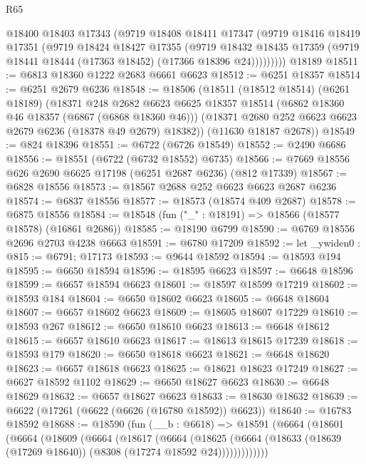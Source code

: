 \begin{lexlean}{R65}
\begin{coremodule}
{          @18400
          @18403
          @17343
          (@9719
            @18408
            @18411
            @17347
            (@9719
              @18416
              @18419
              @17351
              (@9719
                @18424
                @18427
                @17355
                (@9719
                  @18432
                  @18435
                  @17359
                  (@9719 @18441 @18444 (@17363 @18452) (@17366 @18396 @24)))))))))
    @18189
@18511 := @6813 @18360 @1222 @2683 @6661 @6623
@18512 := @6251 @18357
@18514 := @6251 @2679 @6236
@18548 := @18506
    (@18511
      (@18512 @18514)
      (@6261 @18189)
      (@18371
        @248
        @2682
        @6623
        @6625
        @18357
        @18514
        (@6862 @18360 @46 @18357 (@6867 (@6868 @18360 @46)))
        (@18371 @2680 @252 @6623 @6623 @2679 @6236 (@18378 @49 @2679) @18382))
      (@11630 @18187 @2678))
@18549 := @824 @18396
@18551 := @6722 (@6726 @18549)
@18552 := @2490 @6686
@18556 := @18551 (@6722 (@6732 @18552) @6735)
@18566 := @7669 @18556 @626 @2690 @6625 @17198 (@6251 @2687 @6236) (@812 @17339)
@18567 := @6828 @18556
@18573 := @18567 @2688 @252 @6623 @6623 @2687 @6236
@18574 := @6837 @18556
@18577 := @18573 (@18574 @409 @2687)
@18578 := @6875 @18556
@18584 := @18548 (fun ("_" : @18191) => @18566 (@18577 @18578) (@16861 @2686))
@18585 := @18190 @6799
@18590 := @6769 @18556 @2696 @2703 @4238 @6663
@18591 := @6780 @17209
@18592 := let _ywiden0 : @815 := @6791; @17173
@18593 := @9644 @18592
@18594 := @18593 @194
@18595 := @6650 @18594
@18596 := @18595 @6623
@18597 := @6648 @18596
@18599 := @6657 @18594 @6623
@18601 := @18597 @18599 @17219
@18602 := @18593 @184
@18604 := @6650 @18602 @6623
@18605 := @6648 @18604
@18607 := @6657 @18602 @6623
@18609 := @18605 @18607 @17229
@18610 := @18593 @267
@18612 := @6650 @18610 @6623
@18613 := @6648 @18612
@18615 := @6657 @18610 @6623
@18617 := @18613 @18615 @17239
@18618 := @18593 @179
@18620 := @6650 @18618 @6623
@18621 := @6648 @18620
@18623 := @6657 @18618 @6623
@18625 := @18621 @18623 @17249
@18627 := @6627 @18592 @1102
@18629 := @6650 @18627 @6623
@18630 := @6648 @18629
@18632 := @6657 @18627 @6623
@18633 := @18630 @18632
@18639 := @6622 (@17261 (@6622 (@6626 (@16780 @18592)) @6623))
@18640 := @16783 @18592
@18688 := @18590
    (fun (__b : @6618) =>
    @18591
      (@6664
        (@18601
          (@6664
            (@18609
              (@6664
                (@18617
                  (@6664
                    (@18625
                      (@6664 (@18633 (@18639 (@17269 @18640)) (@8308 (@17274 @18592 @24)))))))))))))
}
\end{coremodule}
\end{lexlean}
